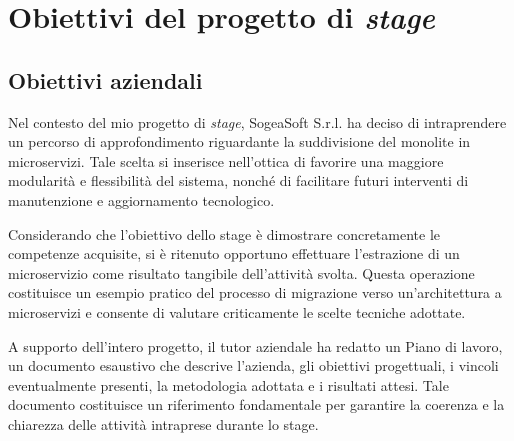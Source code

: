     \section{Obiettivi del progetto di \textit{stage}}
        \subsection{Obiettivi aziendali}
        Nel contesto del mio progetto di \textit{stage}, SogeaSoft S.r.l. ha deciso di intraprendere un percorso di approfondimento riguardante la suddivisione del monolite in microservizi. Tale scelta si inserisce nell'ottica di favorire una maggiore modularità e flessibilità del sistema, nonché di facilitare futuri interventi di manutenzione e aggiornamento tecnologico.  

        Considerando che l’obiettivo dello stage è dimostrare concretamente le competenze acquisite, si è ritenuto opportuno effettuare l’estrazione di un microservizio come risultato tangibile dell’attività svolta. Questa operazione costituisce un esempio pratico del processo di migrazione verso un'architettura a microservizi e consente di valutare criticamente le scelte tecniche adottate.  

        A supporto dell’intero progetto, il tutor aziendale ha redatto un Piano di lavoro, un documento esaustivo che descrive l’azienda, gli obiettivi progettuali, i vincoli eventualmente presenti, la metodologia adottata e i risultati attesi. Tale documento costituisce un riferimento fondamentale per garantire la coerenza e la chiarezza delle attività intraprese durante lo stage. 

